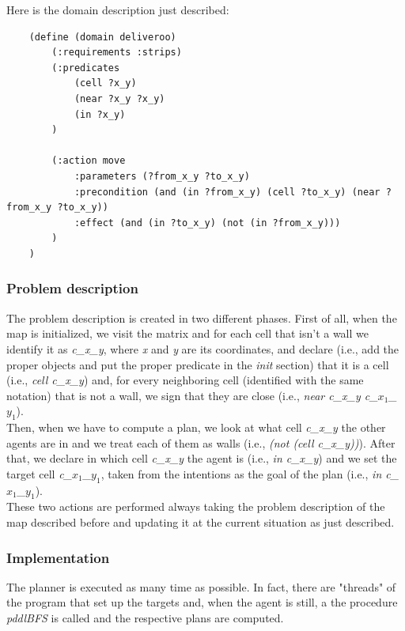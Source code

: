\documentclass[a4paper, 11pt]{article}
\begin{document}
Here is the domain description just described:
\begin{verbatim}
    (define (domain deliveroo)
        (:requirements :strips)
        (:predicates
            (cell ?x_y)
            (near ?x_y ?x_y)
            (in ?x_y)
        )
        
        (:action move
            :parameters (?from_x_y ?to_x_y)
            :precondition (and (in ?from_x_y) (cell ?to_x_y) (near ?from_x_y ?to_x_y))
            :effect (and (in ?to_x_y) (not (in ?from_x_y)))
        )
    )
\end{verbatim}

\subsubsection{Problem description}

The problem description is created in two different phases.
First of all, when the map is initialized, we visit the matrix and for each cell that isn't a wall we identify it as \emph{c\_x\_y}, where \emph{x} and \emph{y} are its coordinates, and declare (i.e., add the proper objects and put the proper predicate in the \emph{init} section) that it is a cell (i.e., \emph{cell c\_x\_y}) and, for every neighboring cell (identified with the same notation) that is not a wall, we sign that they are close (i.e., \emph{near c\_x\_y c\_\(x_1\)\_\(y_1\)}).\\
Then, when we have to compute a plan, we look at what cell \emph{c\_x\_y} the other agents are in and we treat each of them as walls (i.e., \emph{(not (cell c\_x\_y))}). After that, we declare in which cell \emph{c\_x\_y} the agent is (i.e., \emph{in c\_x\_y}) and we set the target cell \emph{c\_\(x_1\)\_\(y_1\)}, taken from the intentions as the goal of the plan (i.e., \emph{in c\_\(x_1\)\_\(y_1\)}).\\
These two actions are performed always taking the problem description of the map described before and updating it at the current situation as just described.

\subsubsection{Implementation}

The planner is executed as many time as possible. In fact, there are "threads" of the program that set up the targets and, when the agent is still, a the procedure \emph{pddlBFS} is called and the respective plans are computed.\\
\end{document}
